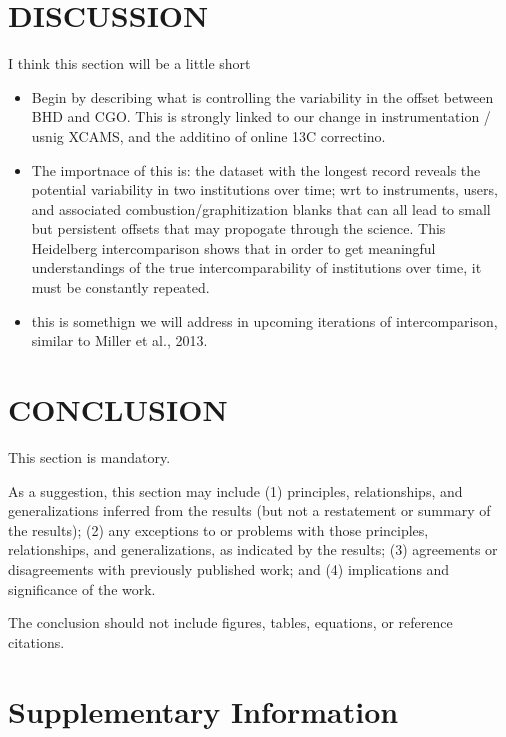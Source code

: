 \documentclass{BrJG_submit}
\begin{document}
\newpage
\section*{DISCUSSION}
I think this section will be a little short
\begin{itemize}
	\item Begin by describing what is controlling the variability in the offset between BHD and CGO. This is strongly linked to our change in instrumentation / usnig XCAMS, and the additino of online 13C correctino.
	\item The importnace of this is: the dataset with the longest record reveals the potential variability in two institutions over time; wrt to instruments, users, and associated combustion/graphitization blanks that can all lead to small but persistent offsets that may propogate through the science. This Heidelberg intercomparison shows that in order to get meaningful understandings of the true intercomparability of institutions over time, it must be constantly repeated. 
	\item this is somethign we will address in upcoming iterations of intercomparison, similar to Miller et al., 2013. 

\end{itemize}



\section*{CONCLUSION}
This section is mandatory.

As a suggestion, this section may include (1) principles, relationships, and generalizations inferred from the results (but not a restatement or summary of the results); (2) any exceptions to or problems with those principles, relationships, and generalizations, as indicated by the results; (3) agreements or disagreements with previously published work; and (4) implications and significance of the work.

The conclusion should not include figures, tables, equations, or reference citations.


\section{Supplementary Information}
\label{sec:conc}
\end{document}
